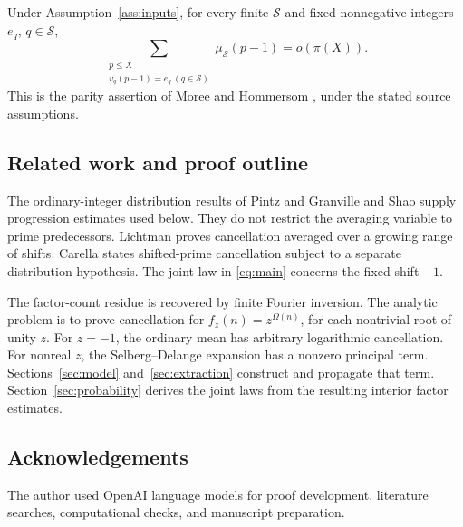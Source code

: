 \begin{corollary}\label{cor:moree}
Under Assumption~\ref{ass:inputs}, for every finite $\mathcal S$ and
fixed nonnegative integers $e_q$, $q\in\mathcal S$,
\[
 \sum_{\substack{p\leq X\\v_q(p-1)=e_q\ (q\in\mathcal S)}}
      \mu_{\mathcal S}(p-1)=o(\pi(X)).
\]
This is the parity assertion of Moree and Hommersom
\cite[Conjecture 1]{MH}, under the stated source assumptions.
\end{corollary}

\subsection{Related work and proof outline}

The ordinary-integer distribution results of Pintz \cite{Pintz} and
Granville and Shao \cite{GS} supply progression estimates used below.
They do not restrict the averaging variable to prime predecessors.
Lichtman \cite{Lichtman} proves cancellation averaged over a growing
range of shifts. Carella \cite[Theorems 1.1--1.2]{Carella} states
shifted-prime cancellation subject to a separate distribution hypothesis.
The joint law in \eqref{eq:main} concerns the fixed shift $-1$.

The factor-count residue is recovered by finite Fourier inversion.
The analytic problem is to prove cancellation for
$f_z(n)=z^{\Omega(n)}$, for each nontrivial root of unity $z$.
For $z=-1$, the ordinary mean has arbitrary logarithmic cancellation.
For nonreal $z$, the Selberg--Delange expansion has a nonzero principal
term. Sections~\ref{sec:model} and~\ref{sec:extraction} construct and
propagate that term. Section~\ref{sec:probability} derives the joint
laws from the resulting interior factor estimates.

\subsection*{Acknowledgements}
The author used OpenAI language models for proof development,
literature searches, computational checks, and manuscript preparation.
